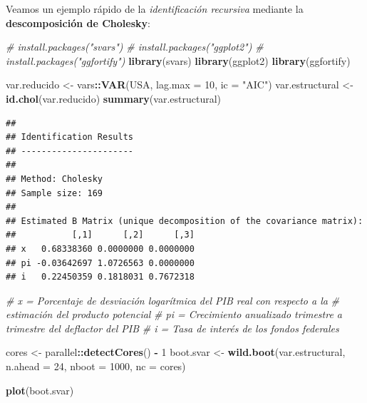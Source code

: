 \documentclass[
]{book}
\newenvironment{Shaded}{\begin{snugshade}}{\end{snugshade}}
\newcommand{\AttributeTok}[1]{\textcolor[rgb]{0.13,0.29,0.53}{#1}}
\newcommand{\CommentTok}[1]{\textcolor[rgb]{0.56,0.35,0.01}{\textit{#1}}}
\newcommand{\DecValTok}[1]{\textcolor[rgb]{0.00,0.00,0.81}{#1}}
\newcommand{\FunctionTok}[1]{\textcolor[rgb]{0.13,0.29,0.53}{\textbf{#1}}}
\newcommand{\NormalTok}[1]{#1}
\newcommand{\OtherTok}[1]{\textcolor[rgb]{0.56,0.35,0.01}{#1}}
\newcommand{\SpecialCharTok}[1]{\textcolor[rgb]{0.81,0.36,0.00}{\textbf{#1}}}
\newcommand{\StringTok}[1]{\textcolor[rgb]{0.31,0.60,0.02}{#1}}
\begin{document}
Veamos un ejemplo rápido de la \emph{identificación recursiva} mediante la \textbf{descomposición de Cholesky}:

\begin{Shaded}
\begin{Highlighting}[]
\CommentTok{\# install.packages("svars")}
\CommentTok{\# install.packages("ggplot2")}
\CommentTok{\# install.packages("ggfortify")}
\FunctionTok{library}\NormalTok{(svars)}
\FunctionTok{library}\NormalTok{(ggplot2)}
\FunctionTok{library}\NormalTok{(ggfortify)}

\NormalTok{var.reducido }\OtherTok{\textless{}{-}}\NormalTok{ vars}\SpecialCharTok{::}\FunctionTok{VAR}\NormalTok{(USA, }\AttributeTok{lag.max =} \DecValTok{10}\NormalTok{, }\AttributeTok{ic =} \StringTok{"AIC"}\NormalTok{)}
\NormalTok{var.estructural }\OtherTok{\textless{}{-}} \FunctionTok{id.chol}\NormalTok{(var.reducido)}
\FunctionTok{summary}\NormalTok{(var.estructural)}
\end{Highlighting}
\end{Shaded}

\begin{verbatim}
## 
## Identification Results
## ---------------------- 
## 
## Method: Cholesky
## Sample size: 169
## 
## Estimated B Matrix (unique decomposition of the covariance matrix): 
##           [,1]      [,2]      [,3]
## x   0.68338360 0.0000000 0.0000000
## pi -0.03642697 1.0726563 0.0000000
## i   0.22450359 0.1818031 0.7672318
\end{verbatim}

\begin{Shaded}
\begin{Highlighting}[]
\CommentTok{\# x  = Porcentaje de desviación logarítmica del PIB real con respecto a la }
\CommentTok{\#      estimación del producto potencial}
\CommentTok{\# pi = Crecimiento anualizado trimestre a trimestre del deflactor del PIB}
\CommentTok{\# i  = Tasa de interés de los fondos federales}

\NormalTok{cores }\OtherTok{\textless{}{-}}\NormalTok{ parallel}\SpecialCharTok{::}\FunctionTok{detectCores}\NormalTok{() }\SpecialCharTok{{-}} \DecValTok{1}
\NormalTok{boot.svar }\OtherTok{\textless{}{-}} \FunctionTok{wild.boot}\NormalTok{(var.estructural, }\AttributeTok{n.ahead =} \DecValTok{24}\NormalTok{, }\AttributeTok{nboot =} \DecValTok{1000}\NormalTok{, }\AttributeTok{nc =}\NormalTok{ cores)}

\FunctionTok{plot}\NormalTok{(boot.svar)}
\end{Highlighting}
\end{Shaded}
\end{document}
